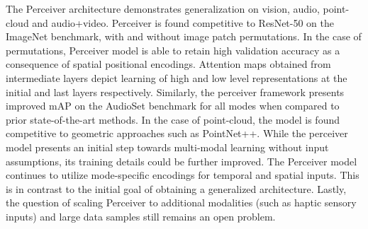 \documentclass[11pt,letterpaper]{article}
\begin{document}
The Perceiver architecture demonstrates generalization on vision, audio, point-cloud and audio+video. Perceiver is found competitive to ResNet-50 on the ImageNet benchmark, with and without image patch permutations. In the case of permutations, Perceiver model is able to retain high validation accuracy as a consequence of spatial positional encodings. Attention maps obtained from intermediate layers depict learning of high and low level representations at the initial and last layers respectively. Similarly, the perceiver framework presents improved mAP on the AudioSet benchmark for all modes when compared to prior state-of-the-art methods. In the case of point-cloud, the model is found competitive to geometric approaches such as PointNet++. While the perceiver model presents an initial step towards multi-modal learning without input assumptions, its training details could be further improved. The Perceiver model continues to utilize mode-specific encodings for temporal and spatial inputs. This is in contrast to the initial goal of obtaining a generalized architecture. Lastly, the question of scaling Perceiver to additional modalities (such as haptic sensory inputs) and large data samples still remains an open problem.
\end{document}
